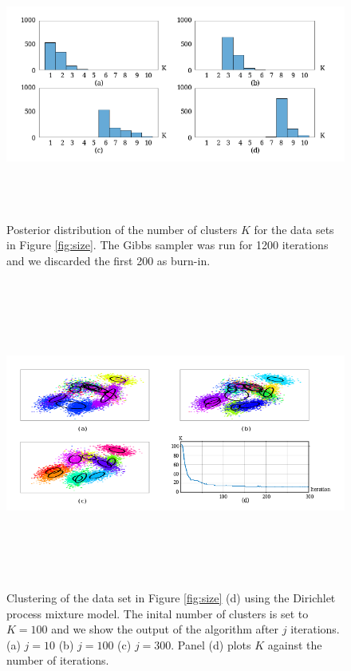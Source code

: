 \documentclass[final,3p,times,twocolumn]{elsarticle}
\begin{document}
\begin{figure}
\includegraphics[width=\textwidth,height=3.5in]{drawing3.png}
\caption{Posterior distribution of the number of clusters $K$ for the data sets in Figure \ref{fig:size}.
The Gibbs sampler was run for 1200 iterations and we discarded the first 200 as burn-in.}
\label{fig:hist}
\end{figure}


\begin{figure}
\includegraphics[width=\textwidth,height=4in]{drawing4.png}
\caption{Clustering of the data set in Figure \ref{fig:size} (d) using the Dirichlet process mixture model. The inital number of clusters is set to $K=100$ and we show the output of the algorithm after $j$ iterations.
(a) $j=10$ (b) $j=100$ (c) $j=300$.
Panel (d) plots $K$ against the number of iterations.}
\label{fig:iter}
\end{figure}
\end{document}
